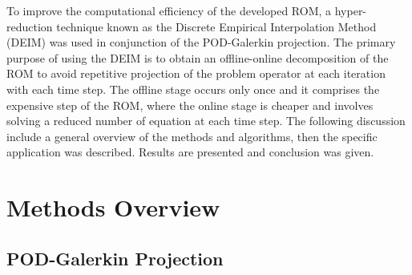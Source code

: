 \documentclass[]{interact}
\theoremstyle{plain}%
\theoremstyle{definition}
\theoremstyle{remark}
\begin{document}
To improve the computational efficiency of the developed ROM, a hyper-reduction technique known as the Discrete Empirical Interpolation Method (DEIM) was used in conjunction of the POD-Galerkin projection.
The primary purpose of using the DEIM is to obtain an offline-online decomposition of the ROM to avoid repetitive projection of the problem operator at each iteration with each time step.
The offline stage occurs only once and it comprises the expensive step of the ROM, where the online stage is cheaper and involves solving a reduced number of equation at each time step.
The following discussion include a general overview of the methods and algorithms, then the specific application was described.
Results are presented and conclusion was given.

\section{Methods Overview}
\subsection{POD-Galerkin Projection}\label{class}
\end{document}
